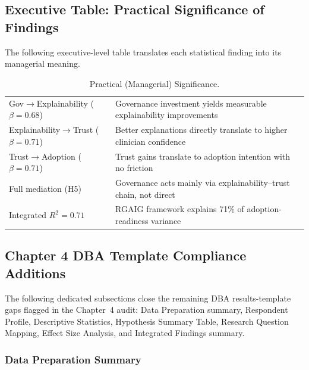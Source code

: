 \subsection{Executive Table: Practical Significance of Findings}
\label{sec:exec_practical_significance}

\noindent The following executive-level table translates each statistical finding into its managerial meaning.

{\tablestripes\tablefontsize
{}
\begin{xltabular}{\textwidth}{@{} >{\raggedright\arraybackslash}p{6cm} L @{}}
\caption[Practical (Managerial) Significance]{Practical (Managerial) Significance.}\label{tab:exec_practical_significance} \\
\toprule
{} &  \\
\midrule
\endfirsthead
\endhead
\bottomrule
\endlastfoot
Gov$\rightarrow$Explainability ($\beta=0.68$) & Governance investment yields measurable explainability improvements \\
\addlinespace
Explainability$\rightarrow$Trust ($\beta=0.71$) & Better explanations directly translate to higher clinician confidence \\
\addlinespace
Trust$\rightarrow$Adoption ($\beta=0.71$) & Trust gains translate to adoption intention with no friction \\
\addlinespace
Full mediation (H5) & Governance acts mainly via explainability--trust chain, not direct \\
\addlinespace
Integrated $R^2=0.71$ & RGAIG framework explains 71\% of adoption-readiness variance \\
\end{xltabular}}


\subsection{Chapter 4 DBA Template Compliance Additions}
\label{sec:ch4_template_compliance}

\noindent The following dedicated subsections close the remaining DBA results-template gaps flagged in the Chapter~4 audit: Data Preparation summary, Respondent Profile, Descriptive Statistics, Hypothesis Summary Table, Research Question Mapping, Effect Size Analysis, and Integrated Findings summary.

\subsubsection{Data Preparation Summary}
\label{sec:ch4_data_preparation}

